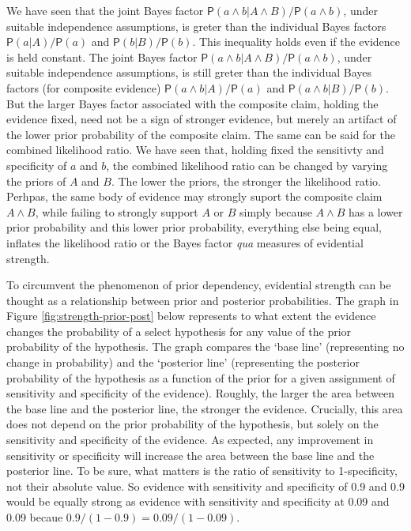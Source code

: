 \documentclass[10pt,dvipsnames,enabledeprecatedfontcommands]{scrartcl}
\newcommand{\pr}[1]{\mathsf{P}(#1)}
\begin{document}
We have seen that the joint Bayes factor
\(\pr{a \wedge b| A\wedge B}/\pr{a \wedge b}\), under suitable
independence assumptions, is greter than the individual Bayes factors
\(\pr{a | A}/\pr{a}\) and \(\pr{b|B}/\pr{b}\). This inequality holds
even if the evidence is held constant. The joint Bayes factor
\(\pr{a \wedge b| A\wedge B}/\pr{a \wedge b}\), under suitable
independence assumptions, is still greter than the individual Bayes
factors (for composite evidence) \(\pr{a \wedge b | A}/\pr{a}\) and
\(\pr{a\wedge b|B}/\pr{b}\). But the larger Bayes factor associated with
the composite claim, holding the evidence fixed, need not be a sign of
stronger evidence, but merely an artifact of the lower prior probability
of the composite claim. The same can be said for the combined likelihood
ratio. We have seen that, holding fixed the sensitivty and specificity
of \(a\) and \(b\), the combined likelihood ratio can be changed by
varying the priors of \(A\) and \(B\). The lower the priors, the
stronger the likelihood ratio. Perhpas, the same body of evidence may
strongly suport the composite claim \(A\wedge B\), while failing to
strongly support \(A\) or \(B\) simply because \(A\wedge B\) has a lower
prior probability and this lower prior probability, everything else
being equal, inflates the likelihood ratio or the Bayes factor
\textit{qua} measures of evidential strength.

To circumvent the phenomenon of prior dependency, evidential strength
can be thought as a relationship between prior and posterior
probabilities. The graph in Figure \ref{fig:strength-prior-post} below
represents to what extent the evidence changes the probability of a
select hypothesis for any value of the prior probability of the
hypothesis. The graph compares the `base line' (representing no change
in probability) and the `posterior line' (representing the posterior
probability of the hypothesis as a function of the prior for a given
assignment of sensitivity and specificity of the evidence). Roughly, the
larger the area between the base line and the posterior line, the
stronger the evidence. Crucially, this area does not depend on the prior
probability of the hypothesis, but solely on the sensitivity and
specificity of the evidence. As expected, any improvement in sensitivity
or specificity will increase the area between the base line and the
posterior line. To be sure, what matters is the ratio of sensitivity to
1-specificity, not their absolute value. So evidence with sensitivity
and specificity of 0.9 and 0.9 would be equally strong as evidence with
sensitivity and specificity at 0.09 and 0.09 becaue
\(0.9/(1-0.9) = 0.09/(1-0.09)\).
\end{document}
